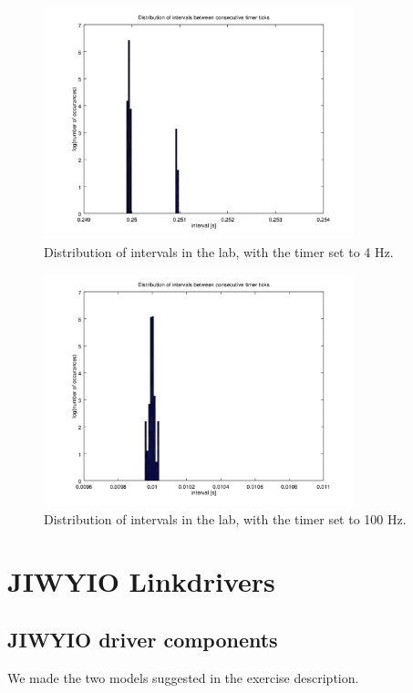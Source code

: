 \documentclass[a4paper,twoside,11pt]{article}
\begin{document}
\begin{figure}
 \centering
 \includegraphics[width=0.8\textwidth]{./img/interval-jitter-rt.png}
 \caption{Distribution of intervals in the lab, with the timer set to 4 Hz.}
 \label{fig:interval-jitter-rt}
\end{figure}
\begin{figure}
 \centering
 \includegraphics[width=0.8\textwidth]{./img/interval-jitter-rt2.png}
 \caption{Distribution of intervals in the lab, with the timer set to 100 Hz.}
 \label{fig:interval-jitter-rt2}
\end{figure}

\FloatBarrier
\section{JIWYIO Linkdrivers}
\subsection{JIWYIO driver components}
We made the two models suggested in the exercise description.
\end{document}
